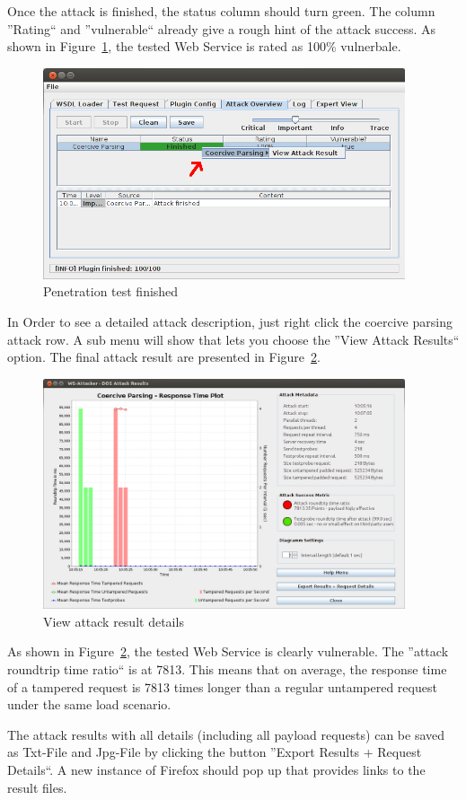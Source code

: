 Once the attack is finished, the status column should turn green. The column ''Rating`` and ''vulnerable`` already give a rough hint of the attack success.
As shown in Figure~\ref{fig:dosStep4_2}, the tested Web Service is rated as 100\% vulnerbale. 
\begin{figure}[ht!]
    \begin{center}
        \includegraphics[width=0.95\textwidth]{img/dosStep4_2.png}
    \end{center}
    \caption{Penetration test finished}
    \label{fig:dosStep4_2}
\end{figure}

In Order to see a detailed attack description, just right click the coercive parsing attack row. 
A sub menu will show that lets you choose the ''View Attack Results`` option. The final attack result are presented in Figure~\ref{fig:dosStep4_3}.
\begin{figure}[H]
    \begin{center}
        \includegraphics[width=0.95\textwidth]{img/dosStep4_3.png}
    \end{center}
    \caption{View attack result details}
    \label{fig:dosStep4_3}
\end{figure}
As shown in Figure~\ref{fig:dosStep4_3}, the tested Web Service is clearly vulnerable. 
The ''attack roundtrip time ratio`` is at 7813. This means that on average, the response time of a tampered request is 7813 times longer than a regular untampered request under the same load scenario.

The attack results with all details (including all payload requests) can be saved as Txt-File and Jpg-File by clicking the button ''Export Results + Request Details``.
A new instance of Firefox should pop up that provides links to the result files.
